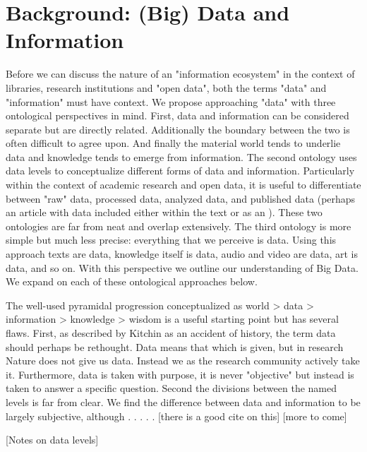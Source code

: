 \section{Background: (Big) Data and Information}

Before we can discuss the nature of an "information ecosystem" in the context of libraries, research institutions and "open data", both the terms "data" and "information" must have context. We propose approaching "data" with three ontological perspectives in mind. First, data and information can be considered separate but are directly related. Additionally the boundary between the two is often difficult to agree upon. And finally the material world tends to underlie data and knowledge tends to emerge from information. The second ontology uses data levels to conceptualize different forms of data and information. Particularly within the context of academic research and open data, it is useful to differentiate between "raw" data, processed data, analyzed data, and published data (perhaps an article with data included either within the text or as an ). These two ontologies are far from neat and overlap extensively. The third ontology is more simple but much less precise: everything that we perceive is data. Using this approach texts are data, knowledge itself is data, audio and video are data, art is data, and so on. With this perspective we outline our understanding of Big Data. We expand on each of these ontological approaches below.

The well-used pyramidal progression conceptualized as world > data > information > knowledge > wisdom is a useful starting point but has several flaws. First, as described by Kitchin as an accident of history, the term data should perhaps be rethought. Data means that which is given, but in research Nature does not give us data. Instead we as the research community actively take it. Furthermore, data is taken with purpose, it is never "objective" but instead is taken to answer a specific question. Second the divisions between the named levels is far from clear. We find the difference between data and information to be largely subjective, although  . . . . . [there is a good cite on this] [more to come]

[Notes on data levels]